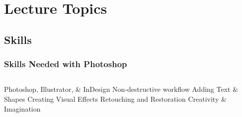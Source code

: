 \documentclass{beamer}
\begin{document}
\begin{frame}
\begin{columns}
\begin{center}
				\end{center}
			\end{columns}
		\end{frame}

	\section{Lecture Topics}
			\subsection{Skills}		
				\begin{frame}
					\frametitle{Skills Needed with Photoshop}
					\begin{columns}
						\vspace{-50pt}
						\begin{outline}
							\1 Photoshop, Illustrator, \& InDesign
							\1 Non-destructive workflow
							\1 Adding Text \& Shapes
							\1 Creating Visual Effects
							\1 Retouching and Restoration
							\1 Creativity \& Imagination
						\end{outline}
						\vspace{-10pt}
						\begin{center}

\end{center}
\end{columns}
\end{frame}
\end{document}
